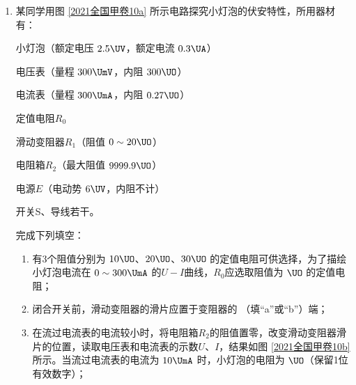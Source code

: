 \documentclass[\gkver]{gaokaozhenti}
\begin{document}
\begin{enumerate}
由表中数据可得，小铜块沿斜面下滑的加速度大小为  $\Umsq$，小铜块与瓷砖表面间的动摩擦因数为 。（结果均保留2位有效数字，重力加速度大小取 $9.80\Umsq$）



\item
某同学用图 \ref{2021全国甲卷10a} 所示电路探究小灯泡的伏安特性，所用器材有：

小灯泡（额定电压 $2.5\UV$，额定电流 $0.3\UA$）

电压表（量程 $300\UmV$，内阻 $300\UO$）

电流表（量程 $300\UmA$，内阻 $0.27\UO$）

定值电阻$R_{0}$

滑动变阻器$R_{1}$（阻值 $0\sim20\UO$）

电阻箱$R_{2}$（最大阻值 $9999.9\UO$）

电源$E$（电动势 $6\UV$，内阻不计）

开关S、导线若干。

完成下列填空：

\begin{enumerate}
	\item
	有3个阻值分别为 $10\UO$、$20\UO$、$30\UO$ 的定值电阻可供选择，为了描绘小灯泡电流在 $0\sim300\UmA$ 的$U-I$曲线，$R_{0}$应选取阻值为  $\UO$ 的定值电阻；

	\item
	闭合开关前，滑动变阻器的滑片应置于变阻器的  （填“a”或“b”）端；

	\item
	在流过电流表的电流较小时，将电阻箱$R_{2}$的阻值置零，改变滑动变阻器滑片的位置，读取电压表和电流表的示数$U$、$I$，结果如图 \ref{2021全国甲卷10b} 所示。当流过电流表的电流为 $10\UmA$ 时，小灯泡的电阻为  $\UO$（保留1位有效数字）；


\end{enumerate}
\end{enumerate}
\end{document}
